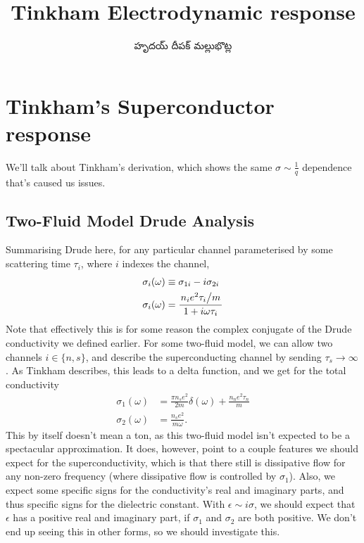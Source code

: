 \documentclass[../main.tex]{subfiles}
\title{Tinkham Electrodynamic response}
\author{\begin{telugu}హృదయ్ దీపక్ మల్లుభొట్ల\end{telugu}}
\date{}
\begin{document}
	\onlyinsubfile{\maketitle}
	\section{Tinkham's Superconductor response} \label{sec:TinkhamResponse}

	We'll talk about Tinkham's derivation\supercite{Tinkham}, which shows the same $\sigma\sim\frac{1}{q}$ dependence that's caused us issues.

	\subsection{Two-Fluid Model Drude Analysis} \label{subsec:twofluid}

	Summarising Drude here, for any particular channel parameterised by some scattering time $\tau_i$, where $i$ indexes the channel,
	\begin{align}
		\sigma_i(\omega) &\equiv \sigma_{1i} - i \sigma_{2i} \\
		\sigma_i(\omega) &= \frac{\flatfrac{n_i e^2 \tau_i}{m}}{1 + i \omega \tau_i} \label{eq:tinkhamdrude}
	\end{align}
	Note that effectively this is for some reason the complex conjugate of the Drude conductivity we defined earlier.
	For some two-fluid model, we can allow two channels $i \in \{n, s\}$, and describe the superconducting channel by sending $\tau_s \rightarrow \infty$.
	As Tinkham describes, this leads to a delta function, and we get for the total conductivity
	\begin{align}
		\sigma_1(\omega) &= \frac{\pi n_s e^2}{2m} \delta(\omega) + \frac{n_n e^2 \tau_n}{m} \\
		\sigma_2(\omega) &= \frac{n_s e^2}{m \omega}.
	\end{align}
	This by itself doesn't mean a ton, as this two-fluid model isn't expected to be a spectacular approximation.
	It does, however, point to a couple features we should expect for the superconductivity, which is that there still is dissipative flow for any non-zero frequency (where dissipative flow is controlled by $\sigma_1$).
	Also, we expect some specific signs for the conductivity's real and imaginary parts, and thus specific signs for the dielectric constant.
	With $\epsilon \sim i \sigma$, we should expect that $\epsilon$ has a positive real and 	imaginary part, if $\sigma_1$ and $\sigma_2$ are both positive.
	We don't end up seeing this in other forms, so we should investigate this.
\end{document}

